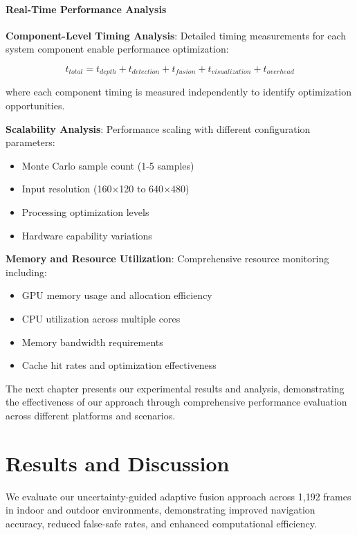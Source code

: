\documentclass[12pt,oneside]{book}
\begin{document}
\subsubsection{Real-Time Performance Analysis}

\textbf{Component-Level Timing Analysis}:
Detailed timing measurements for each system component enable performance optimization:

\begin{equation}
t_{total} = t_{depth} + t_{detection} + t_{fusion} + t_{visualization} + t_{overhead}
\end{equation}

where each component timing is measured independently to identify optimization opportunities.

\textbf{Scalability Analysis}:
Performance scaling with different configuration parameters:
\begin{itemize}
\item Monte Carlo sample count (1-5 samples)
\item Input resolution (160$\times$120 to 640$\times$480)
\item Processing optimization levels
\item Hardware capability variations
\end{itemize}

\textbf{Memory and Resource Utilization}:
Comprehensive resource monitoring including:
\begin{itemize}
\item GPU memory usage and allocation efficiency
\item CPU utilization across multiple cores
\item Memory bandwidth requirements
\item Cache hit rates and optimization effectiveness
\end{itemize}

\vspace{12pt}
The next chapter presents our experimental results and analysis, demonstrating the effectiveness of our approach through comprehensive performance evaluation across different platforms and scenarios.

\chapter{Results and Discussion}

We evaluate our uncertainty-guided adaptive fusion approach across 1,192 frames in indoor and outdoor environments, demonstrating improved navigation accuracy, reduced false-safe rates, and enhanced computational efficiency.
\end{document}
